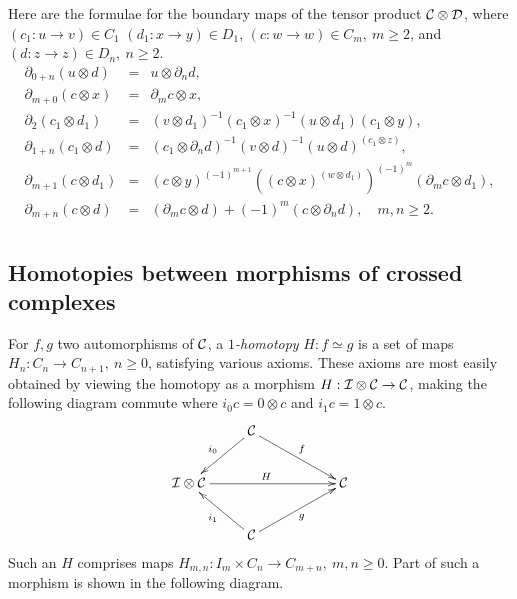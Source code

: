 \bigskip
Here are the formulae for the boundary maps of the tensor product 
$\mathcal{C}\otimes\mathcal{D}$, 
where $(c_1 : u \to v) \in C_1$ $(d_1 : x \to y) \in D_1$, 
$(c : w \to w) \in C_m,~ m \geqslant 2$, 
and $(d : z \to z) \in D_n,~ n \geqslant 2$.   
\begin{eqnarray*}
\partial_{0+n}(u \otimes d) 
  &=&  u \otimes \partial_n d, \\
\partial_{m+0}(c \otimes x) 
  &=&  \partial_m c \otimes x, \\
\partial_2(c_1 \otimes d_1) 
  &=&  (v \otimes d_1)^{-1} (c_1 \otimes x)^{-1} 
          (u \otimes d_1) (c_1 \otimes y), \\
\partial_{1+n}(c_1 \otimes d) 
  &=&  (c_1 \otimes \partial_n d)^{-1} (v \otimes d)^{-1} 
         (u \otimes d)^{(c_1 \otimes z)}, \\
\partial_{m+1}(c \otimes d_1) 
  &=&  (c \otimes y)^{(-1)^{m+1}} 
         \left((c \otimes x)^{(w \otimes d_1)}\right)^{(-1)^m} 
         (\partial_mc \otimes d_1),\\
\partial_{m+n}(c \otimes d) 
  &=&  (\partial_m c \otimes d) + (-1)^m(c \otimes \partial_n d), 
\quad m,n \geqslant 2. \\
\end{eqnarray*}


\newpage
\subsection{Homotopies between morphisms of crossed complexes}
\label{subsect:homotopy-xcomp}

For $f,g$ two automorphisms of $\mathcal{C}$, a \emph{$1$-homotopy} 
$H : f \simeq g$ is a set of maps 
$H_n : C_n \to C_{n+1},~ n \geqslant 0$, 
satisfying various axioms. 
These axioms are most easily obtained by viewing the homotopy 
as a morphism $H : \mathcal{I}\otimes\mathcal{C} \to \mathcal{C}$, 
making the following diagram commute where $i_0c = 0 \otimes c$ 
and $i_1c = 1 \otimes c$. 
$$
\xymatrix{ 
   & \calC \ar[ld]_{i_0} \ar[drr]^f
     & & \\
  \calI\otimes\calC \ar[rrr]^{H}  
   & & & \calC \\
   & \calC \ar[lu]^{i_1} \ar[rru]_g 
     & & \\
}
$$
Such an $H$ comprises maps 
$H_{m,n} : I_m \times C_n \to C_{m+n},~ m,n \geqslant 0$.  
Part of such a morphism is shown in the following diagram. 

\begin{figure}[htbp]
\begin{center}

\label{figure:xcomp-1hom}
\end{center}
\end{figure}

